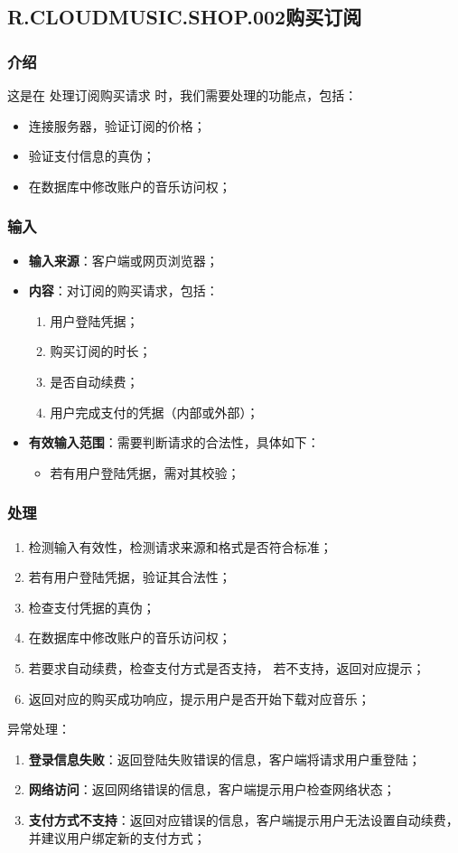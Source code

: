 \subsection{R.CLOUDMUSIC.SHOP.002购买订阅}
\subsubsection{介绍}
	这是在 处理订阅购买请求 时，我们需要处理的功能点，包括：
	\begin{itemize}
		\item 连接服务器，验证订阅的价格；
		\item 验证支付信息的真伪；
		\item 在数据库中修改账户的音乐访问权；
	\end{itemize}
\subsubsection{输入}
	\begin{itemize}
		\item \textbf{输入来源}：客户端或网页浏览器；
		\item \textbf{内容}：对订阅的购买请求，包括：
		\begin{enumerate}
			\item 用户登陆凭据；
			\item 购买订阅的时长；
			\item 是否自动续费；
			\item 用户完成支付的凭据（内部或外部）；
		\end{enumerate}
		\item \textbf{有效输入范围}：需要判断请求的合法性，具体如下：
		\begin{itemize}
			\item 若有用户登陆凭据，需对其校验； 
		\end{itemize}
	\end{itemize}
\subsubsection{处理}
	\begin{enumerate}
		\item 检测输入有效性，检测请求来源和格式是否符合标准；
		\item 若有用户登陆凭据，验证其合法性；
		\item 检查支付凭据的真伪；
		\item 在数据库中修改账户的音乐访问权；
		\item 若要求自动续费，检查支付方式是否支持，
			若不支持，返回对应提示；
		\item 返回对应的购买成功响应，提示用户是否开始下载对应音乐；
	\end{enumerate}
	\noindent 异常处理：
	\begin{enumerate}
		\item \textbf{登录信息失败}：返回登陆失败错误的信息，客户端将请求用户重登陆；
		\item \textbf{网络访问}：返回网络错误的信息，客户端提示用户检查网络状态；
		\item \textbf{支付方式不支持}：返回对应错误的信息，客户端提示用户无法设置自动续费，
			并建议用户绑定新的支付方式；
	\end{enumerate}
